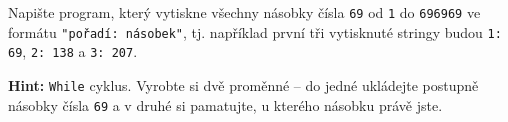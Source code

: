 \question[50]
Napište program, který vytiskne všechny násobky čísla \texttt{69} od \texttt{1}
do \texttt{696969} ve formátu \texttt{"pořadí: násobek"}, tj. například první
tři vytisknuté stringy budou \texttt{1: 69}, \texttt{2: 138} a \texttt{3: 207}.

\textbf{Hint:} \texttt{While} cyklus. Vyrobte si dvě proměnné -- do jedné
ukládejte postupně násobky čísla \texttt{69} a v druhé si pamatujte, u kterého
násobku právě jste.